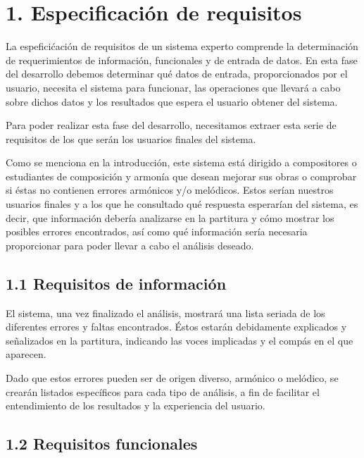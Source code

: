 \chapter*{1. Especificación de requisitos}

La espeficićación de requisitos de un sistema experto comprende la determinación de requerimientos de información, funcionales y de entrada de datos. En esta fase del desarrollo debemos determinar qué datos de entrada, proporcionados por el usuario, necesita el sistema para funcionar, las operaciones que llevará a cabo sobre dichos datos y los resultados que espera el usuario obtener del sistema.  

Para poder realizar esta fase del desarrollo, necesitamos extraer esta serie de requisitos de los que serán los usuarios finales del sistema.

Como se menciona en la introducción, este sistema está dirigido a compositores o estudiantes de composición y armonía que desean mejorar sus obras o comprobar si éstas no contienen errores armónicos y/o melódicos. Estos serían nuestros usuarios finales y a los que he consultado qué respuesta esperarían del sistema, es decir, que información debería analizarse en la partitura y cómo mostrar los posibles errores encontrados, así como qué información sería necesaria proporcionar para poder llevar a cabo el análisis deseado. 

\section*{1.1 Requisitos de información}


El sistema, una vez finalizado el análisis, mostrará una lista seriada de los diferentes errores y faltas encontrados. Éstos estarán debidamente explicados y señalizados en la partitura, indicando las voces implicadas y el compás en el que aparecen. 

Dado que estos errores pueden ser de origen diverso, armónico o melódico, se crearán listados específicos para cada tipo de análisis, a fin de facilitar el entendimiento de los resultados y la experiencia del usuario.   

\section*{1.2 Requisitos funcionales}


